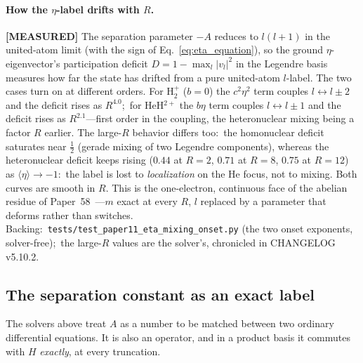 \documentclass[aps,pra,twocolumn,superscriptaddress,longbibliography]{revtex4-2}
\begin{document}
\paragraph{How the $\eta$-label drifts with $R$.}
\textbf{[MEASURED]} The separation parameter $-A$ reduces to $l(l+1)$ in
the united-atom limit (with the sign of Eq.~\eqref{eq:eta_equation}), so the ground $\eta$-eigenvector's participation
deficit $D = 1 - \max_l |v_l|^2$ in the Legendre basis measures how far
the state has drifted from a pure united-atom $l$-label.  The two cases
turn on at different orders.  For H$_2^+$ ($b = 0$) the $c^2\eta^2$ term
couples $l \leftrightarrow l \pm 2$ and the deficit rises as $R^{4.0}$;\
for HeH$^{2+}$ the $b\eta$ term couples $l \leftrightarrow l \pm 1$ and
the deficit rises as $R^{2.1}$---first order in the coupling, the
heteronuclear mixing being a factor $R$ earlier.  The large-$R$ behavior
differs too:\ the homonuclear deficit saturates near $\tfrac12$ (gerade
mixing of two Legendre components), whereas the heteronuclear deficit
keeps rising ($0.44$ at $R = 2$, $0.71$ at $R = 8$, $0.75$ at $R = 12$)
as $\langle\eta\rangle \to -1$:\ the label is lost to \emph{localization}
on the He focus, not to mixing.  Both curves are smooth in $R$.  This is
the one-electron, continuous face of the abelian residue of
Paper~58~\cite{loutey_paper58}---$m$ exact at every $R$, $l$ replaced by
a parameter that deforms rather than switches.  Backing:\
\texttt{tests/test\_paper11\_eta\_mixing\_onset.py} (the two onset
exponents, solver-free);\ the large-$R$ values are the solver's, chronicled
in CHANGELOG v5.10.2.

\subsection{The separation constant as an exact label}
\label{sec:separation_label}

The solvers above treat $A$ as a number to be matched between two
ordinary differential equations. It is also an operator, and in a
product basis it commutes with $H$ \emph{exactly}, at every truncation.
\end{document}
